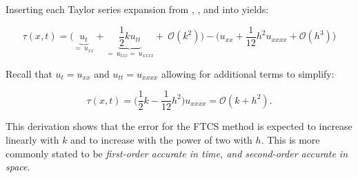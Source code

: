 \begin{tcolorbox}[colback=gray!5!white,colframe=gray!75!black]
Inserting each Taylor series expansion from , , and  into  yields: 

\begin{equation}
    \tau(x, t) = \bigg(\underbrace{u_t}_{= \ u_{xx}} + \underbrace{\frac{1}{2} k u_{tt}}_{= \ u_{txx} = \ u_{xxxx}} + \ \mathcal{O}(k^2) \bigg) - (u_{xx} + \frac{1}{12}h^2 u_{xxxx} + \mathcal{O}(h^3) \bigg) 
\end{equation}

Recall that $u_t = u_{xx}$ and $u_{tt} = u_{xxxx}$ allowing for additional terms to simplify: 

\begin{equation*}
    \tau(x,t) = \big(\frac{1}{2}k - \frac{1}{12}h^2\big) u_{xxxx} = \mathcal{O}(k + h^2). 
\end{equation*}

This derivation shows that the error for the FTCS method is expected to increase linearly with $k$ and to increase with the power of two with $h$. This is more commonly stated to be \textit{first-order accurate in time, and second-order accurate in space}. 

\end{tcolorbox}
\vspace{0.5cm}

